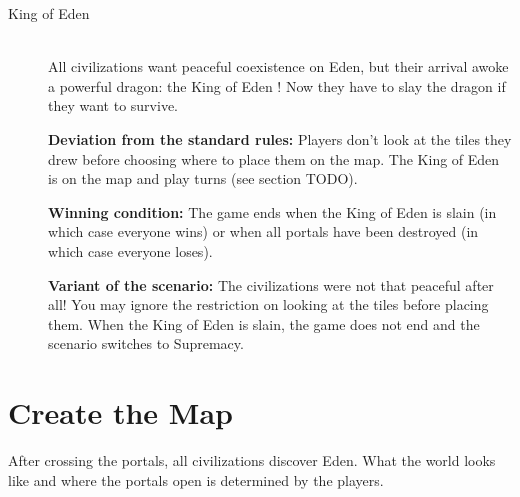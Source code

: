 \documentclass[a4paper]{article}
\begin{document}
\begin{description}
        \item[King of Eden] \hfill \\
            All civilizations want peaceful coexistence on Eden,
            but their arrival awoke a powerful dragon: the King of Eden !
            Now they have to slay the dragon if they want to survive.
            
            \textbf{Deviation from the standard rules:}
            Players don't look at the tiles they drew before choosing
            where to place them on the map.
            The King of Eden is on the map and play turns (see section TODO).
            
            \textbf{Winning condition:}
            The game ends when the King of Eden is slain (in which case everyone wins)
            or when all portals have been destroyed (in which case everyone loses).
            
            \textbf{Variant of the scenario:}
            The civilizations were not that peaceful after all!
            You may ignore the restriction on looking at the tiles before placing them.
            When the King of Eden is slain,
            the game does not end and the scenario switches to Supremacy.
    \end{description}



\newpage
\section{Create the Map}

    After crossing the portals, all civilizations discover Eden.
    What the world looks like and where the portals open is determined by the players.
    
\end{document}
